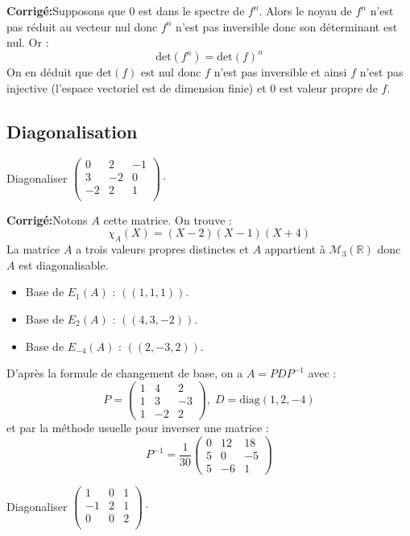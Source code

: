 \documentclass[a4paper,twoside,french,10pt]{VcCours}
\newcommand{\corr}{\textbf{Corrigé:}}
\begin{document}
\corr Supposons que $0$ est dans le spectre de $f^n$. Alors le noyau de $f^n$ n'est pas réduit au vecteur nul donc $f^n$ n'est pas inversible donc son déterminant est nul. Or :
$$ \textrm{det}(f^n) = \textrm{det}(f)^n$$
On en déduit que $\textrm{det}(f)$ est nul donc $f$ n'est pas inversible et ainsi $f$ n'est pas injective (l'espace vectoriel est de dimension finie) et $0$ est valeur propre de $f$.


\subsection{Diagonalisation}


\begin{Exercice}{} Diagonaliser $\begin{pmatrix}
0 & 2 & -1 \\
3 & -2 & 0 \\
-2 & 2 & 1 \\
\end{pmatrix}\cdot$
\end{Exercice}

\corr Notons $A$ cette matrice. On trouve :
$$ \chi_A(X) = (X-2)(X-1)(X+4)$$
La matrice $A$ a trois valeurs propres distinctes et $A$ appartient à $\mathcal{M}_3(\mathbb{R})$ donc $A$ est diagonalisable.
\begin{itemize}
\item Base de $E_1(A)$ : $((1,1,1))$.
\item Base de $E_2(A)$ : $((4,3,-2))$.
\item Base de $E_{-4}(A)$ : $((2,-3,2))$.
\end{itemize}
D'après la formule de changement de base, on a $A = PDP^{-1}$ avec :
$$ P = \begin{pmatrix}
1 & 4 & 2 \\
1 & 3 & -3 \\
1 & -2 & 2
\end{pmatrix}, \; D=\textrm{diag}(1,2,-4)$$
et par la méthode usuelle pour inverser une matrice :
$$ P^{-1} = \dfrac{1}{30} \begin{pmatrix}
0 & 12 & 18 \\
5 & 0 & -5 \\
5 & -6 & 1 
\end{pmatrix}$$

\begin{Exercice}{} Diagonaliser $\begin{pmatrix}
1 & 0& 1 \\
-1 & 2 & 1 \\
0 & 0 & 2 \\
\end{pmatrix}\cdot$
\end{Exercice}
\end{document}
